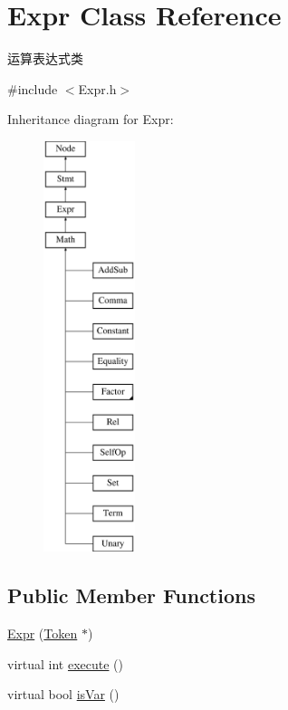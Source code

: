 \hypertarget{class_expr}{}\section{Expr Class Reference}
\label{class_expr}


运算表达式类  




{\ttfamily \#include $<$Expr.\+h$>$}

Inheritance diagram for Expr\+:\begin{figure}[H]
\begin{center}
\leavevmode
\includegraphics[height=12.000000cm]{class_expr}
\end{center}
\end{figure}
\subsection*{Public Member Functions}
\begin{DoxyCompactItemize}
\item 
\hyperlink{class_expr_a5a045d68e601c2e782e1958d55a07400}{Expr} (\hyperlink{class_token}{Token} $\ast$)
\item 
virtual int \hyperlink{class_expr_aff6a2e6eaa460e2a3db28ebdab089b51}{execute} ()
\item 
virtual bool \hyperlink{class_expr_add2b30644dd850c4bfa2d619d20d8c09}{is\+Var} ()
\end{DoxyCompactItemize}
